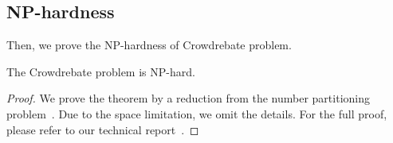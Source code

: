 \subsection{NP-hardness}

Then, we prove the NP-hardness of Crowdrebate problem.

\begin{theorem}
	\label{theorem:NP}
	The Crowdrebate problem is NP-hard.
\end{theorem}

\begin{proof}
	We prove the theorem by a reduction from the number partitioning problem~\cite{hayes2002computing}. Due to the space limitation, we omit the details. For the full proof, please refer to our technical report~\cite{Report}.


\end{proof}

  
